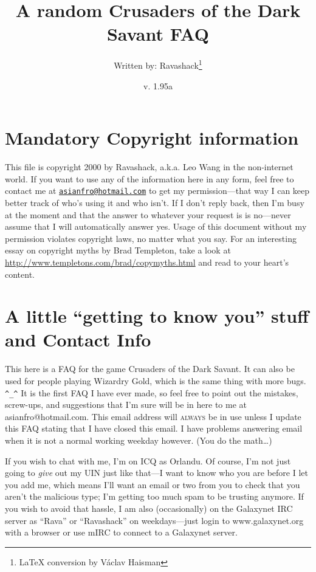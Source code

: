 \documentclass[12pt]{article}
\title{A random Crusaders of the Dark Savant FAQ}
\author{Written by: Ravashack\protect\footnote{\LaTeX{} conversion by Václav Haisman}}
\date{v. 1.95a}
\newcommand\textlcsc[1]{\texorpdfstring{\textsc{\MakeLowercase{#1}}}{#1}}
\begin{document}
\maketitle

\section{Mandatory Copyright
information}\label{mandatory-copyright-information}

This file is copyright 2000 by Ravashack, a.k.a. Leo Wang in the non-internet
world. If you want to use any of the information here in any form, feel free
to contact me at
\href{mailto:asianfro@hotmail.com}{\nolinkurl{asianfro@hotmail.com}} to get
my permission---that way I can keep better track of who's using it and who
isn't. If I don't reply back, then I'm busy at the moment and that the answer
to whatever your request is is no---never assume that I will automatically
answer yes. Usage of this document without my permission violates copyright
laws, no matter what you say. For an interesting essay on copyright myths by
Brad Templeton, take a look at
\url{http://www.templetons.com/brad/copymyths.html} and read to your heart's
content.

\section{\texorpdfstring{A little ``getting to know you'' stuff and
Contact
Info}{A little getting to know you stuff and Contact Info}}\label{a-little-getting-to-know-you-stuff-and-contact-info}

This here is a FAQ for the game Crusaders of the Dark Savant. It can also be
used for people playing Wizardry Gold, which is the same thing with more
bugs. \texttt{\^{}\_\^{}} It is the first FAQ I have ever made, so feel free
to point out the mistakes, screw-ups, and suggestions that I'm sure will be
in here to me at asianfro@hotmail.com. This email address will
\textlcsc{ALWAYS} be in use unless I update this FAQ stating that I have
closed this email. I have problems answering email when it is not a normal
working weekday however. (You do the math\ldots{})

If you wish to chat with me, I'm on ICQ as Orlandu. Of course, I'm not
just going to \emph{give} out my UIN just like that---I want to know who
you are before I let you add me, which means I'll want an email or two
from you to check that you aren't the malicious type; I'm getting too
much spam to be trusting anymore. If you wish to avoid that hassle, I am
also (occasionally) on the Galaxynet IRC server as ``Rava'' or
``Ravashack'' on weekdays---just login to www.galaxynet.org with a
browser or use mIRC to connect to a Galaxynet server.
\end{document}
